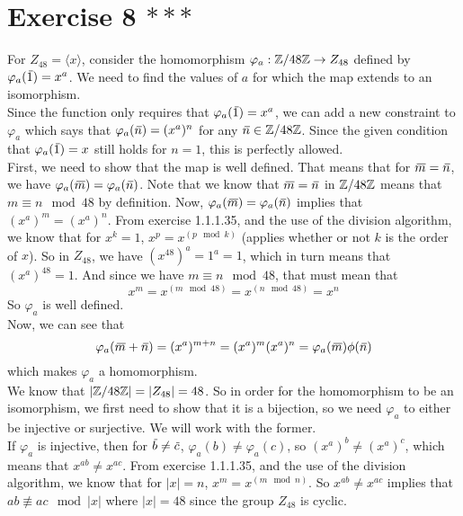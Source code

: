 \documentclass[12pt]{article}
\begin{document}
    \section*{Exercise 8 $***$}
    For $Z_{48} = \langle x \rangle$,
    consider the homomorphism $\varphi_a: \mathbb{Z}/48\mathbb{Z} \to Z_{48}$
    defined by $\varphi_a(\,\overline{\!{1}}) = x^a$.
    We need to find the values of $a$ for which the map extends to
    an isomorphism. \\
    Since the function only requires that $\varphi_a(\,\overline{\!{1}}) = x^a$,
    we can add a new constraint to $\varphi_a$ which says that 
    $\varphi_a(\,\overline{\!{n}}) = (x^a)^n$ for any $\,\overline{\!{n}} \in \mathbb{Z}/48\mathbb{Z}$.
    Since the given condition that $\varphi_a(\,\overline{\!{1}}) = x$
    still holds for $n = 1$, this is perfectly allowed. \\
    First, we need to show that the map is well defined.
    That means that for $\,\overline{\!{m}} = \,\overline{\!{n}}$,
    we have $\varphi_a(\,\overline{\!{m}}) = \varphi_a(\,\overline{\!{n}})$.
    Note that we know that $\,\overline{\!{m}} = \,\overline{\!{n}}$ in $\mathbb{Z}/48\mathbb{Z}$
    means that $m \equiv n \mod 48$ by definition.
    Now, $\varphi_a(\,\overline{\!{m}}) = \varphi_a(\,\overline{\!{n}})$
    implies that $(x^a)^m = (x^a)^n$.
    From exercise 1.1.1.35, and the use of the division
    algorithm, we know that for $x^k = 1$, $x^p = x^{(p \mod k)}$
    (applies whether or not $k$ is the order of $x$).
    So in $Z_{48}$, we have $(x^{48})^a = 1^a = 1$,
    which in turn means that $(x^a)^{48} = 1$.
    And since we have $m \equiv n \mod 48$, that must mean
    that
    \[ x^m = x^{(m \mod 48)} = x^{(n \mod 48)} = x^n \]
    So $\varphi_a$ is well defined. \\
    Now, we can see that
    \[ \varphi_a(\,\overline{\!{m}} + \,\overline{\!{n}}) = (x^a)^{m + n}
    = (x^a)^m(x^a)^n
    = \varphi_a(\,\overline{\!{m}})\phi(\,\overline{\!{n}})  \]
    which makes $\varphi_a$ a homomorphism. \\
    We know that $|\mathbb{Z}/48\mathbb{Z}| = |Z_{48}| = 48$.
    So in order for the homomorphism to be an isomorphism,
    we first need to show that it is a bijection,
    so we need $\varphi_a$ to either be injective or surjective.
    We will work with the former. \\
    If $\varphi_a$ is injective,
    then for $\,\overline{\!{b}} \neq \,\overline{\!{c}}$,
    $\varphi_a(b) \neq \varphi_a(c)$,
    so $(x^a)^b \neq (x^a)^c$,
    which means that $x^{ab} \neq x^{ac}$.
    From exercise 1.1.1.35, and the use of the division
    algorithm, we know that for $|x| = n$, $x^m = x^{(m \mod n)}$.
    So $x^{ab} \neq x^{ac}$ implies that $ab \not\equiv ac \mod |x|$
    where $|x| = 48$ since the group $Z_{48}$ is cyclic.
\end{document}
